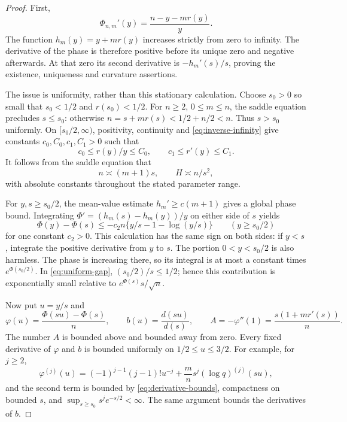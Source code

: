 \begin{proof}
First,
\[
 \Phi_{n,m}'(y)=\frac{n-y-mr(y)}{y}.
\]
The function $h_m(y)=y+mr(y)$ increases strictly from zero to infinity.
The derivative of the phase is therefore positive before its unique
zero and negative afterwards. At that zero its second derivative is
$-h_m'(s)/s$, proving the existence, uniqueness and curvature assertions.

The issue is uniformity, rather than this stationary calculation.
Choose $s_0>0$ so small that $s_0<1/2$ and $r(s_0)<1/2$.
For $n\ge2$, $0\le m\le n$, the saddle equation precludes $s\le s_0$:
otherwise $n=s+mr(s)<1/2+n/2<n$. Thus $s>s_0$ uniformly.
On $[s_0/2,\infty)$, positivity, continuity and
\eqref{eq:inverse-infinity} give constants $c_0,C_0,c_1,C_1>0$ such that
\begin{equation}\label{eq:uniform-comparability}
 c_0\le r(y)/y\le C_0,\qquad c_1\le r'(y)\le C_1.
\end{equation}
It follows from the saddle equation that
\[
 n\asymp(m+1)s,\qquad H\asymp n/s^2,
\]
with absolute constants throughout the stated parameter range.

For $y,s\ge s_0/2$, the mean-value estimate
$h_m'\ge c(m+1)$ gives a global phase bound. Integrating
$\Phi'=(h_m(s)-h_m(y))/y$ on either side of $s$ yields
\begin{equation}\label{eq:uniform-gap}
 \Phi(y)-\Phi(s)
 \le-c_2n\{y/s-1-\log(y/s)\}
 \qquad(y\ge s_0/2)
\end{equation}
for one constant $c_2>0$. This calculation has the same sign on both
sides: if $y<s$, integrate the positive derivative from $y$ to $s$.
The portion $0<y<s_0/2$ is also harmless. The phase is increasing there,
so its integral is at most a constant times
$e^{\Phi(s_0/2)}$. In \eqref{eq:uniform-gap},
$(s_0/2)/s\le1/2$; hence this contribution is exponentially small
relative to $e^{\Phi(s)}s/\sqrt n$.

Now put $u=y/s$ and
\[
 \varphi(u)=\frac{\Phi(su)-\Phi(s)}n,
 \qquad b(u)=\frac{d(su)}{d(s)},
 \qquad A=-\varphi''(1)=\frac{s(1+mr'(s))}{n}.
\]
The number $A$ is bounded above and bounded away from zero. Every fixed
derivative of $\varphi$ and $b$ is bounded uniformly on $1/2\le u\le3/2$.
For example, for $j\ge2$,
\[
 \varphi^{(j)}(u)
 =(-1)^{j-1}(j-1)!u^{-j}
   +\frac{m}{n}s^j(\log q)^{(j)}(su),
\]
and the second term is bounded by \eqref{eq:derivative-bounds}, compactness
on bounded $s$, and $\sup_{s\ge s_0}s^j e^{-s/2}<\infty$.
The same argument bounds the derivatives of $b$.


\end{proof}
